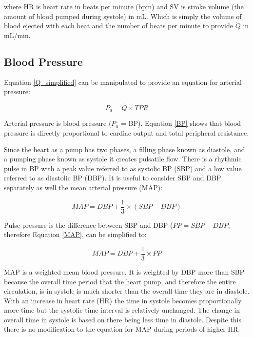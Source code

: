 where HR is heart rate in beats per minute (bpm) and SV is stroke volume (the amount of blood pumped during systole) in mL. Which is simply the volume of blood ejected with each beat and the number of beats per minute to provide $\dot{Q}$ in mL/min.

\subsection{Blood Pressure}

Equation \ref{Q_simplified} can be manipulated to provide an equation for arterial pressure:

\begin{equation}
    P_{a} = \dot{Q} \times TPR
    \label{BP}
\end{equation}

Arterial pressure is blood pressure ($P_a$ = BP). Equation \ref{BP} shows that blood pressure is directly proportional to cardiac output and total peripheral resistance. 

Since the heart as a pump has two phases, a filling phase known as diastole, and a pumping phase known as systole it creates pulsatile flow. There is a rhythmic pulse in BP with a peak value referred to as systolic BP (SBP) and a low value referred to as diastolic BP (DBP). It is useful to consider SBP and DBP separately as well the mean arterial pressure (MAP):

\begin{equation}
    MAP = DBP + \frac{1}{3} \times (SBP - DBP)
    \label{MAP}
\end{equation}

Pulse pressure is the difference between SBP and DBP ($PP = SBP - DBP$, therefore Equation \ref{MAP}, can be simplified to:

\begin{equation}
    MAP = DBP + \frac{1}{3} \times PP
    \label{MAP_simplified}
\end{equation}

MAP is a weighted mean blood pressure. It is weighted by DBP more than SBP because the overall time period that the heart pump, and therefore the entire circulation, is in systole is much shorter than the overall time they are in diastole. With an increase in heart rate (HR) the time in systole becomes proportionally more time but the systolic time interval is relatively unchanged. The change in overall time in systole is based on there being less time in diastole. Despite this there is no modification to the equation for MAP during periods of higher HR.


